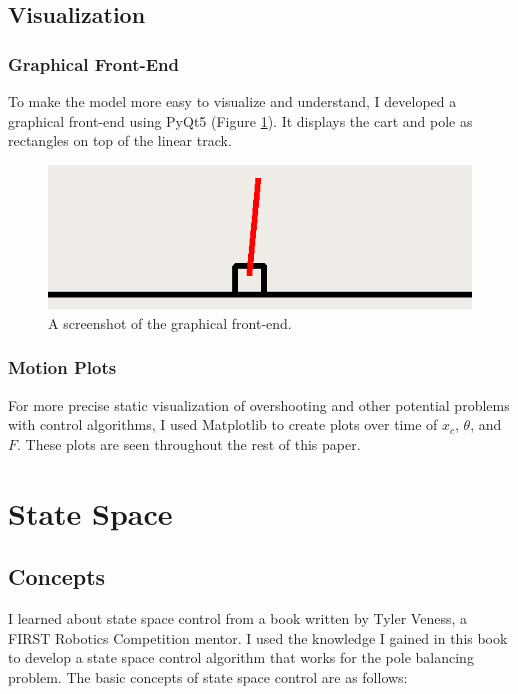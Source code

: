 \documentclass[12pt]{article}
\begin{document}
\subsection{Visualization}

\subsubsection{Graphical Front-End}

To make the model more easy to visualize and understand, I developed a graphical front-end using PyQt5 (Figure \ref{simulation}). It displays the cart and pole as rectangles on top of the linear track.

\begin{figure}[ht]
    \centering
    \includegraphics[width=\textwidth]{simulation}
    \caption{\label{simulation} A screenshot of the graphical front-end.}
\end{figure}

\subsubsection{Motion Plots}

For more precise static visualization of overshooting and other potential problems with control algorithms, I used Matplotlib \cite{matplotlib} to create plots over time of $x _c$, $\theta$, and $F$. These plots are seen throughout the rest of this paper.

\section{State Space}

\subsection{Concepts}

I learned about state space control from a book \cite{veness} written by Tyler Veness, a FIRST Robotics Competition mentor. I used the knowledge I gained in this book to develop a state space control algorithm that works for the pole balancing problem. The basic concepts of state space control are as follows:
\end{document}

